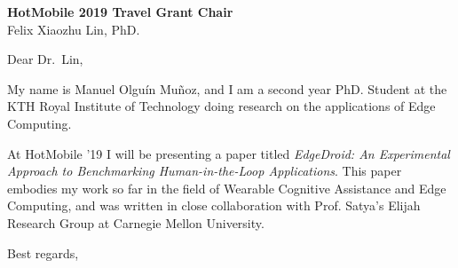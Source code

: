 \documentclass[english]{kthletter}
\date{Stockholm, \today}
\begin{document}
\begin{letter}%
  {
      \textbf{HotMobile 2019 Travel Grant Chair}\\
      Felix Xiaozhu Lin, PhD.
  }
\opening{Dear Dr.~Lin,}

My name is Manuel Olguín Muñoz, and I am a second year PhD. Student at the KTH Royal Institute of Technology doing research on the applications of Edge Computing.

At HotMobile '19 I will be presenting a paper titled \emph{EdgeDroid: An Experimental Approach to Benchmarking Human-in-the-Loop Applications}. 
This paper embodies my work so far in the field of Wearable Cognitive Assistance and Edge Computing, and was written in close collaboration with Prof. Satya's Elijah Research Group at Carnegie Mellon University.

\closing{Best regards,}

\end{letter}
\end{document}
